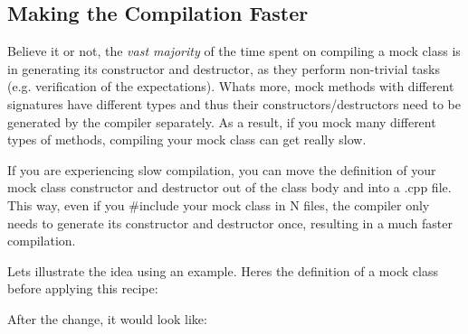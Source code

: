 \subsection*{Making the Compilation Faster}

Believe it or not, the {\itshape vast majority} of the time spent on compiling a mock class is in generating its constructor and destructor, as they perform non-\/trivial tasks (e.\+g. verification of the expectations). What\textquotesingle{}s more, mock methods with different signatures have different types and thus their constructors/destructors need to be generated by the compiler separately. As a result, if you mock many different types of methods, compiling your mock class can get really slow.

If you are experiencing slow compilation, you can move the definition of your mock class\textquotesingle{} constructor and destructor out of the class body and into a {\ttfamily .cpp} file. This way, even if you {\ttfamily \#include} your mock class in N files, the compiler only needs to generate its constructor and destructor once, resulting in a much faster compilation.

Let\textquotesingle{}s illustrate the idea using an example. Here\textquotesingle{}s the definition of a mock class before applying this recipe\+:


\begin{DoxyCode}{0}
\DoxyCodeLine{\textcolor{comment}{// File mock\_foo.h.}}
\DoxyCodeLine{ \textcolor{keyword}{public}:}
\DoxyCodeLine{  \textcolor{comment}{// Since we don't declare the constructor or the destructor,}}
\DoxyCodeLine{  \textcolor{comment}{// the compiler will generate them in every translation unit}}
\DoxyCodeLine{  \textcolor{comment}{// where this mock class is used.}}
\DoxyCodeLine{}
\DoxyCodeLine{\};}
\end{DoxyCode}


After the change, it would look like\+:


